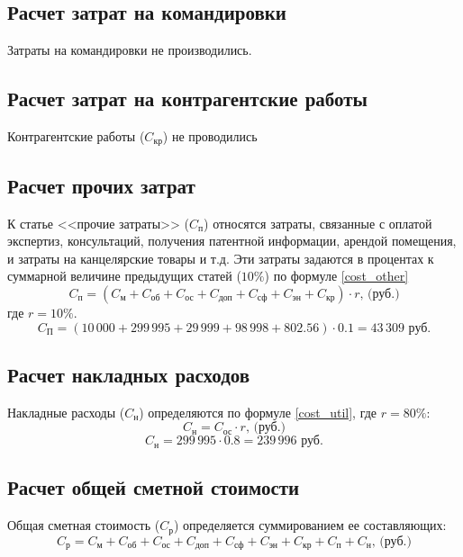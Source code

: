 \subsection{Расчет затрат на командировки}
Затраты на командировки не производились.

\subsection{Расчет затрат на контрагентские работы}
Контрагентские работы ($C_\textit{кр}$) не проводились

\subsection{Расчет прочих затрат}
К статье <<прочие затраты>> ($C_\textit{п}$) относятся затраты, связанные с оплатой экспертиз, консультаций, получения патентной информации, арендой помещения, и затраты на канцелярские товары и т.д. Эти затраты задаются в процентах к суммарной величине предыдущих статей ($10\%$) по формуле \ref{cost_other}
\begin{equation}
	C_\textit{п} = (C_\textit{м}+C_\textit{об}+C_\textit{ос}+C_\textit{доп}+C_\textit{сф}+ C_\textit{эн}+C_\textit{кр})\cdot r \mbox{, (руб.)}
	\label{cost_other}
\end{equation}
где $r=10\%$.
$$
	C_\textit{П} = (10\,000 + 299\,995 + 29\,999 + 98\,998 + 802.56)\cdot 0.1 = 43\,309 \mbox{ руб.}
$$

\subsection{Расчет накладных расходов}
Накладные расходы ($C_\textit{н}$) определяются по формуле \ref{cost_util}, где $r = 80\%$:
\begin{equation}
	C_\textit{н} = C_\textit{ос} \cdot r \mbox{, (руб.)}
	\label{cost_util}
\end{equation}
$$
	C_\textit{н} = 299\,995 \cdot 0.8 = 239\,996 \mbox{ руб.}
$$

\subsection{Расчет общей сметной стоимости}
Общая сметная стоимость ($C_\textit{р}$) определяется суммированием ее составляющих:
\begin{equation}
	C_\textit{р} = C_\textit{м}+C_\textit{об}+C_\textit{ос}+C_\textit{доп}+C_\textit{сф}+ C_\textit{эн}+C_\textit{кр}+C_\textit{п}+C_\textit{н} \mbox{, (руб.)}
\end{equation}

